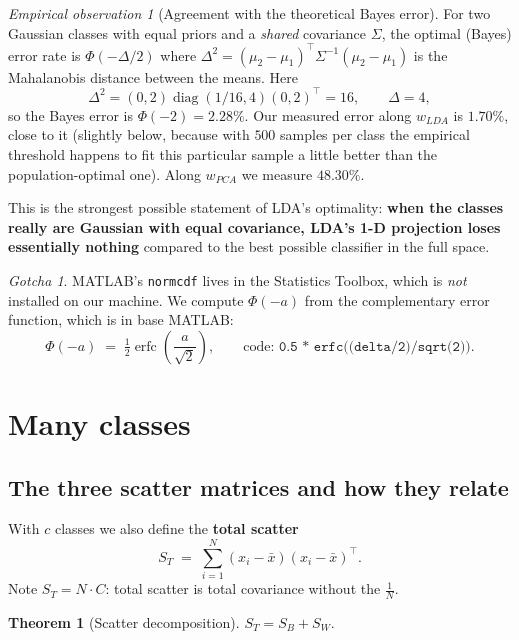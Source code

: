 \documentclass[11pt]{article}
\theoremstyle{definition}
\newtheorem{theorem}{Theorem}[section]
\theoremstyle{remark}
\newtheorem*{gotcha}{Gotcha}
\newtheorem*{observation}{Empirical observation}
\newcommand{\Sw}{S_W}
\newcommand{\Sb}{S_B}
\newcommand{\St}{S_T}
\begin{document}
\begin{observation}[Agreement with the theoretical Bayes error]
For two Gaussian classes with equal priors and a \emph{shared} covariance $\Sigma$,
the optimal (Bayes) error rate is $\Phi(-\Delta/2)$ where
$\Delta^2 = (\mu_2-\mu_1)^{\!\top}\Sigma^{-1}(\mu_2-\mu_1)$ is the Mahalanobis
distance between the means. Here
\[
  \Delta^2 = (0,2)\operatorname{diag}(1/16,4)(0,2)^{\!\top} = 16,\qquad \Delta = 4,
\]
so the Bayes error is $\Phi(-2)=2.28\%$. Our measured error along $w_{LDA}$ is
$1.70\%$, close to it (slightly below, because with $500$ samples per class the
empirical threshold happens to fit this particular sample a little better than the
population-optimal one). Along $w_{PCA}$ we measure $48.30\%$.

This is the strongest possible statement of LDA's optimality: \textbf{when the
classes really are Gaussian with equal covariance, LDA's 1-D projection loses
essentially nothing} compared to the best possible classifier in the full space.
\end{observation}

\begin{gotcha}
MATLAB's \texttt{normcdf} lives in the Statistics Toolbox, which is \emph{not}
installed on our machine. We compute $\Phi(-a)$ from the complementary error
function, which is in base MATLAB:
\[
  \Phi(-a) \;=\; \tfrac12\operatorname{erfc}\!\left(\frac{a}{\sqrt2}\right),
  \qquad\text{code: } \texttt{0.5 * erfc((delta/2)/sqrt(2))}.
\]
\end{gotcha}

\section{Many classes}

\subsection{The three scatter matrices and how they relate}

With $c$ classes we also define the \textbf{total scatter}
\[
  \St \;=\; \sum_{i=1}^{N}(x_i-\bar{x})(x_i-\bar{x})^{\!\top} .
\]
Note $\St = N\cdot C$: total scatter is total covariance without the $\frac1N$.

\begin{theorem}[Scatter decomposition]\label{thm:decomp}
$\St = \Sb + \Sw$.
\end{theorem}
\end{document}
